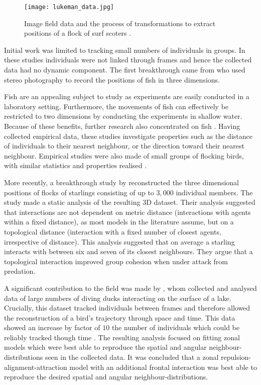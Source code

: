 \begin{figure}[!htbp]
	\texttt{[image: lukeman\_data.jpg]}
	\caption{Image field data and the process of transformations to extract positions of a flock of surf scoters \citep{lukeman10}.}
	\label{fig:lukeman_data}
\end{figure}

Initial work was limited to tracking small numbers of individuals in groups. In these studies individuals were not linked through frames and hence the collected data had no dynamic component. The first breakthrough came from \citet{cullen65} who used stereo photography to record the positions of fish in three dimensions.

Fish are an appealing subject to study as experiments are easily conducted in a laboratory setting. Furthermore, the movements of fish can effectively be restricted to two dimensions by conducting the experiments in shallow water. Because of these benefits, further research also concentrated on fish \citep{van_long85, partridge80}. Having collected empirical data, these studies investigate properties such as the distance of individuals to their nearest neighbour, or the direction toward their nearest neighbour. Empirical studies were also made of small groups of flocking birds, with similar statistics and properties realised \citep{major78, budgey98}.

More recently, a breakthrough study by \citet{ballerini08} reconstructed the three dimensional positions of flocks of starlings consisting of up to $3,000$ individual members. The study made a static analysis of the resulting 3D dataset. Their analysis suggested that interactions are not dependent on metric distance (interactions with agents within a fixed distance), as most models in the literature assume, but on a topological distance (interaction with a fixed number of closest agents, irrespective of distance). This analysis suggested that on average a starling interacts with between six and seven of its closest neighbours. They argue that a topological interaction improved group cohesion when under attack from predation.

A significant contribution to the field was made by \citet{lukeman10}, whom collected and analysed data of large numbers of diving ducks interacting on the surface of a lake. Crucially, this dataset tracked individuals between frames and therefore allowed the reconstruction of a bird's trajectory through space and time. This data showed an increase by factor of $10$ the number of individuals which could be reliably tracked though time \citep{lukeman09}. The resulting analysis focused on fitting zonal models which were best able to reproduce the spatial and angular neighbour-distributions seen in the collected data. It was concluded that a zonal repulsion-alignment-attraction model with an additional frontal interaction was best able to reproduce the desired spatial and angular neighbour-distributions.

